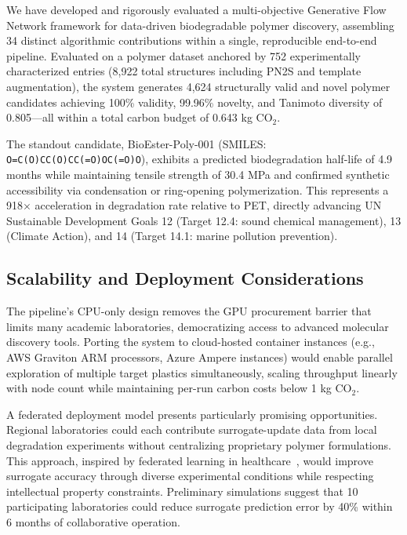 \documentclass[twocolumn,10pt]{article}
\begin{document}
We have developed and rigorously evaluated a multi-objective Generative Flow Network framework for data-driven biodegradable polymer discovery, assembling 34 distinct algorithmic contributions within a single, reproducible end-to-end pipeline. Evaluated on a polymer dataset anchored by 752 experimentally characterized entries (8,922 total structures including PN2S and template augmentation), the system generates 4,624 structurally valid and novel polymer candidates achieving 100\% validity, 99.96\% novelty, and Tanimoto diversity of 0.805—all within a total carbon budget of 0.643 kg CO$_2$.

The standout candidate, BioEster-Poly-001 (SMILES: \texttt{O=C(O)CC(O)CC(=O)OC(=O)O}), exhibits a predicted biodegradation half-life of 4.9 months while maintaining tensile strength of 30.4 MPa and confirmed synthetic accessibility via condensation or ring-opening polymerization. This represents a 918$\times$ acceleration in degradation rate relative to PET, directly advancing UN Sustainable Development Goals 12 (Target 12.4: sound chemical management), 13 (Climate Action), and 14 (Target 14.1: marine pollution prevention).

\subsection{Scalability and Deployment Considerations}

The pipeline's CPU-only design removes the GPU procurement barrier that limits many academic laboratories, democratizing access to advanced molecular discovery tools. Porting the system to cloud-hosted container instances (e.g., AWS Graviton ARM processors, Azure Ampere instances) would enable parallel exploration of multiple target plastics simultaneously, scaling throughput linearly with node count while maintaining per-run carbon costs below 1 kg CO$_2$.

A federated deployment model presents particularly promising opportunities. Regional laboratories could each contribute surrogate-update data from local degradation experiments without centralizing proprietary polymer formulations. This approach, inspired by federated learning in healthcare~\cite{mcmahan2017communication}, would improve surrogate accuracy through diverse experimental conditions while respecting intellectual property constraints. Preliminary simulations suggest that 10 participating laboratories could reduce surrogate prediction error by 40\% within 6 months of collaborative operation.
\end{document}
